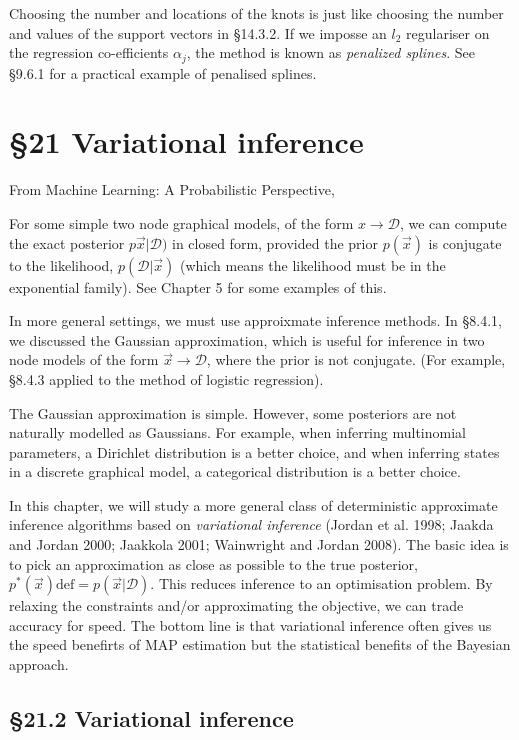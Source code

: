\documentclass{amsart}
\begin{document}
Choosing the number and locations of the knots is just like choosing the number and values 
of the support vectors in \S 14.3.2. If we imposse an $l_2$ regulariser on the regression
co-efficients $\alpha_j$, the method is known as \emph{penalized splines}. See
\S 9.6.1 for a practical example of penalised splines.

\section{\S 21 Variational inference}

From Machine Learning: A Probabilistic Perspective,

For some simple two node graphical models, of the form $x \to \mathcal{D}$, we can compute
the exact posterior $p\vec{x}|\mathcal{D})$ in closed form, provided the prior $p(\vec{x})$ 
is conjugate to the likelihood, $p(\mathcal{D}|\vec{x})$ (which means the likelihood must
be in the exponential family). See Chapter 5 for some examples of this.

In more general settings, we must use approixmate inference methods. In \S 8.4.1, we
discussed the Gaussian approximation, which is useful for inference in two node models of
the form $\vec{x} \to \mathcal{D}$, where the prior is not conjugate. (For example, 
\S 8.4.3 applied to the method of logistic regression).

The Gaussian approximation is simple. However, some posteriors are not naturally modelled as
Gaussians. For example, when inferring multinomial parameters, a Dirichlet
distribution is a better choice, and when inferring states in a discrete graphical model,
a categorical distribution is a better choice.

In this chapter, we will study a more general class of deterministic approximate inference
algorithms based on \emph{variational inference} (Jordan et al. 1998; Jaakda and Jordan 
2000; Jaakkola 2001; Wainwright and Jordan 2008). The basic idea is to pick an approximation
as close as possible to the true posterior,
$p^{*}(\vec{x}) \text{def} = p(\vec{x}|\mathcal{D})$. This reduces inference to an 
optimisation problem. By relaxing the constraints and/or approximating the objective, we can
trade accuracy for speed. The bottom line is that variational inference often gives us the
speed benefirts of MAP estimation but the statistical benefits of the Bayesian approach.

\subsection{\S 21.2 Variational inference}
\end{document}
